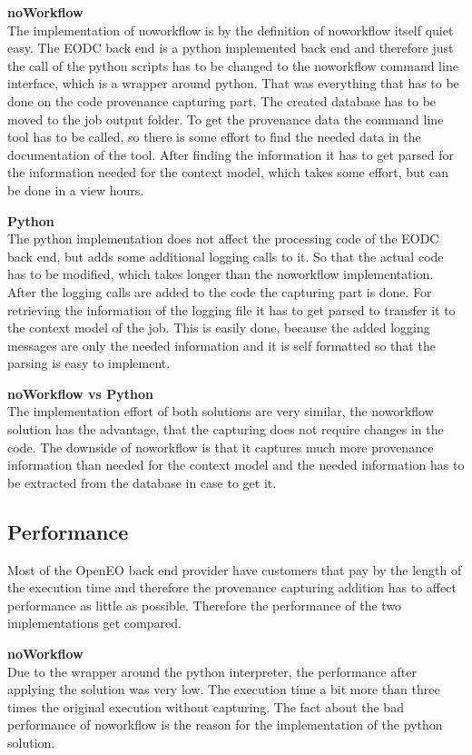 \documentclass[draft,final]{vutinfth} %
\begin{document}
\textbf{noWorkflow} \\
The implementation of noworkflow is by the definition of noworkflow itself quiet easy. The EODC back end is a python implemented back end and therefore just the call of the python scripts has to be changed to the noworkflow command line interface, which is a wrapper around python. That was everything that has to be done on the code provenance capturing part. The created database has to be moved to the job output folder. To get the provenance data the command line tool has to be called, so there is some effort to find the needed data in the documentation of the tool. After finding the information it has to get parsed for the information needed for the context model, which takes some effort, but can be done in a view hours. 

\textbf{Python} \\
The python implementation does not affect the processing code of the EODC back end, but adds some additional logging calls to it. So that the actual code has to be modified, which takes longer than the noworkflow implementation. After the logging calls are added to the code the capturing part is done. For retrieving the information of the logging file it has to get parsed to transfer it to the context model of the job. This is easily done, because the added logging messages are only the needed information and it is self formatted so that the parsing is easy to implement.   

\textbf{noWorkflow vs Python} \\
The implementation effort of both solutions are very similar, the noworkflow solution has the advantage, that the capturing does not require changes in the code. The downside of noworkflow is that it captures much more provenance information than needed for the context model and the needed information has to be extracted from the database in case to get it. 

\subsection{Performance}\label{NvsP:Performance}
Most of the OpenEO back end provider have customers that pay by the length of the execution time and therefore the provenance capturing addition has to affect performance as little as possible. Therefore the performance of the two implementations get compared.

\textbf{noWorkflow} \\
Due to the wrapper around the python interpreter, the performance after applying the solution was very low. The execution time a bit more than three times the original execution without capturing. The fact about the bad performance of noworkflow is the reason for the implementation of the python solution. 
\end{document}
